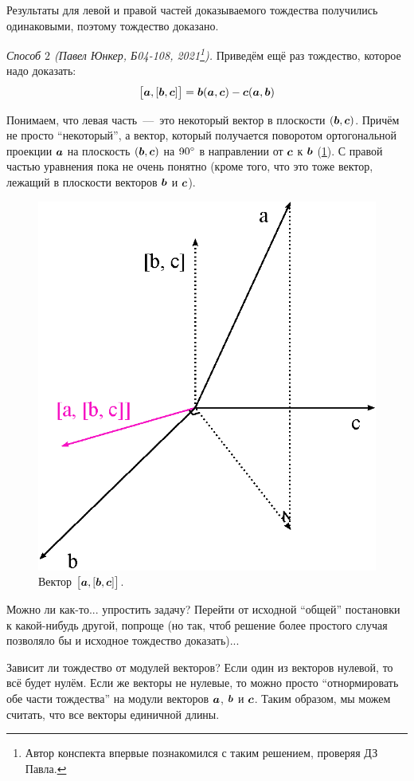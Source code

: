 \documentclass[a4paper,12pt]{article}
\begin{document}
\begin{solution}
    Результаты для левой и правой частей доказываемого тождества получились одинаковыми, поэтому тождество доказано.
    
    \medskip
    
    \emph{Способ $2$ (Павел Юнкер, Б04-108, 2021\footnote{Автор конспекта впервые познакомился с таким решением, проверяя ДЗ Павла.}).}
    Приведём ещё раз тождество, которое надо доказать:
    \[
      \bigl[\boldsymbol a, [\boldsymbol b, \boldsymbol c]\bigr] = \boldsymbol b (\boldsymbol a, \boldsymbol c) - \boldsymbol c (\boldsymbol a, \boldsymbol b)
    \]
    
    Понимаем, что левая часть~---~это некоторый вектор в плоскости $(\boldsymbol b, \boldsymbol c)$.
    Причём не просто ``некоторый'', а вектор, который получается поворотом ортогональной проекции $\boldsymbol a$ на плоскость $(\boldsymbol b, \boldsymbol c)$ на $90\degree$ в направлении от $\boldsymbol c$ к $\boldsymbol b$ (\ref{fig:nonstandard-solution}).
    С правой частью уравнения пока не очень понятно (кроме того, что это тоже вектор, лежащий в плоскости векторов $\boldsymbol b$ и $\boldsymbol c$).
    
    \begin{figure}[h]
      \centering
      
      \includegraphics[width=0.5\columnwidth]{nonstandard-solution}
      
      \caption{Вектор $\bigl[\boldsymbol a, [\boldsymbol b, \boldsymbol c]\bigr]$.}
      \label{fig:nonstandard-solution}
    \end{figure}
    
    Можно ли как-то... упростить задачу?
    Перейти от исходной ``общей'' постановки к какой-нибудь другой, попроще (но так, чтоб решение более простого случая позволяло бы и исходное тождество доказать)...
    
    Зависит ли тождество от модулей векторов?
    Если один из векторов нулевой, то всё будет нулём.
    Если же векторы не нулевые, то можно просто ``отнормировать обе части тождества'' на модули векторов $\boldsymbol a$, $\boldsymbol b$ и $\boldsymbol c$.
    Таким образом, мы можем считать, что все векторы единичной длины.
    

\end{solution}
\end{document}
